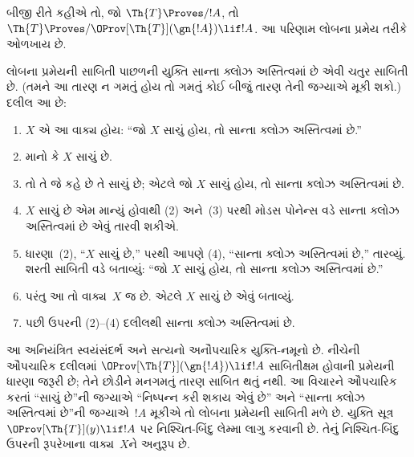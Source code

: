બીજી રીતે કહીએ તો, જો $\Th{T} \Proves/ !A$, તો $\Th{T} \Proves/ \OProv[\Th{T}](\gn{!A}) \lif !A$. આ પરિણામ લોબના પ્રમેય તરીકે ઓળખાય છે.

\begin{explain}
લોબના પ્રમેયની સાબિતી પાછળની યુક્તિ સાન્તા ક્લોઝ અસ્તિત્વમાં છે એવી ચતુર સાબિતી છે. (તમને આ તારણ ન ગમતું હોય તો ગમતું કોઈ બીજું તારણ તેની જગ્યાએ મૂકી શકો.) દલીલ આ છે:
\begin{enumerate}
\item $X$ એ આ વાક્ય હોય: ``જો $X$ સાચું હોય, તો સાન્તા ક્લોઝ અસ્તિત્વમાં છે.''
\item માનો કે $X$ સાચું છે.
\item તો તે જે કહે છે તે સાચું છે; એટલે જો $X$ સાચું હોય, તો સાન્તા ક્લોઝ અસ્તિત્વમાં છે.
\item $X$ સાચું છે એમ માન્યું હોવાથી (2) અને~(3) પરથી મોડસ પોનેન્સ વડે સાન્તા ક્લોઝ અસ્તિત્વમાં છે એવું તારવી શકીએ.
\item ધારણા~(2), ``$X$ સાચું છે,'' પરથી આપણે (4), ``સાન્તા ક્લોઝ અસ્તિત્વમાં છે,'' તારવ્યું. શરતી સાબિતી વડે બતાવ્યું: ``જો $X$ સાચું હોય, તો સાન્તા ક્લોઝ અસ્તિત્વમાં છે.''
\item પરંતુ આ તો વાક્ય~$X$ જ છે. એટલે $X$ સાચું છે એવું બતાવ્યું.
\item પછી ઉપરની (2)--(4) દલીલથી સાન્તા ક્લોઝ અસ્તિત્વમાં છે.
\end{enumerate}
આ અનિયંત્રિત સ્વયંસંદર્ભ અને સત્યનો અનૌપચારિક
યુક્તિ-નમૂનો છે. નીચેની ઔપચારિક દલીલમાં
$\OProv[\Th{T}](\gn{!A})\lif !A$ સાબિતીક્ષમ હોવાની
પ્રમેયની ધારણા જરૂરી છે; તેને છોડીને મનગમતું
તારણ સાબિત થતું નથી.
આ વિચારને ઔપચારિક કરતાં ``સાચું છે''ની જગ્યાએ ``નિષ્પન્ન કરી શકાય એવું છે'' અને ``સાન્તા ક્લોઝ અસ્તિત્વમાં છે''ની જગ્યાએ~$!A$ મૂકીએ તો લોબના પ્રમેયની સાબિતી મળે છે. યુક્તિ સૂત્ર~$\OProv[\Th{T}](y) \lif !A$ પર નિશ્ચિત-બિંદુ લેમ્મા લાગુ કરવાની છે. તેનું નિશ્ચિત-બિંદુ ઉપરની રૂપરેખાના વાક્ય~$X$ને અનુરૂપ છે.
\end{explain}

